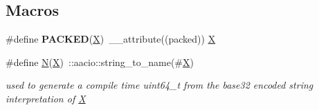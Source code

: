 \subsection*{Macros}
\begin{DoxyCompactItemize}
\item 
\mbox{\label{group__types_ga50d5ac027323a8c324137fc14c46ec7a}} 
\#define {\bfseries P\+A\+C\+K\+ED}(\mbox{\hyperlink{class_x}{X}})~\+\_\+\+\_\+attribute((packed)) \mbox{\hyperlink{class_x}{X}}
\item 
\mbox{\label{group__types_gaf9c1edb0e0da55ec6ba09f32f6839529}} 
\#define \mbox{\hyperlink{group__types_gaf9c1edb0e0da55ec6ba09f32f6839529}{N}}(\mbox{\hyperlink{class_x}{X}})~\+::aacio\+::string\+\_\+to\+\_\+name(\#\mbox{\hyperlink{class_x}{X}})
\begin{DoxyCompactList}\small\item\em used to generate a compile time uint64\+\_\+t from the base32 encoded string interpretation of \mbox{\hyperlink{class_x}{X}} \end{DoxyCompactList}\end{DoxyCompactItemize}
